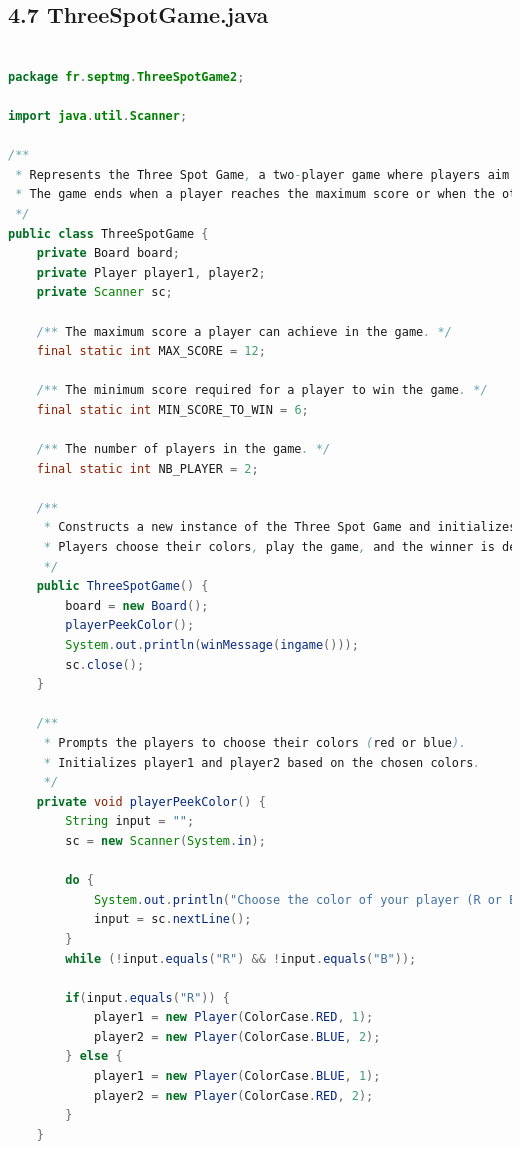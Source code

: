 \documentclass[a4paper,11pt]{article}
\begin{document}
\subsection{4.7 ThreeSpotGame.java}

\begin{lstlisting}[language=Java, breaklines=true]

package fr.septmg.ThreeSpotGame2;

import java.util.Scanner;

/**
 * Represents the Three Spot Game, a two-player game where players aim to score points by making strategic moves on a board.
 * The game ends when a player reaches the maximum score or when the other player fails to meet the minimum score requirement.
 */
public class ThreeSpotGame {
    private Board board;
    private Player player1, player2;
    private Scanner sc;

    /** The maximum score a player can achieve in the game. */
    final static int MAX_SCORE = 12;
    
    /** The minimum score required for a player to win the game. */
    final static int MIN_SCORE_TO_WIN = 6;
    
    /** The number of players in the game. */
    final static int NB_PLAYER = 2;
    
    /**
     * Constructs a new instance of the Three Spot Game and initializes the game components.
     * Players choose their colors, play the game, and the winner is determined.
     */
    public ThreeSpotGame() {
        board = new Board();
        playerPeekColor();
        System.out.println(winMessage(ingame()));
        sc.close();
    }

    /**
     * Prompts the players to choose their colors (red or blue).
     * Initializes player1 and player2 based on the chosen colors.
     */
    private void playerPeekColor() {
        String input = "";
        sc = new Scanner(System.in);

        do {
            System.out.println("Choose the color of your player (R or B): ");
            input = sc.nextLine();
        }
        while (!input.equals("R") && !input.equals("B"));

        if(input.equals("R")) {
            player1 = new Player(ColorCase.RED, 1);
            player2 = new Player(ColorCase.BLUE, 2);
        } else {
            player1 = new Player(ColorCase.BLUE, 1);
            player2 = new Player(ColorCase.RED, 2);
        }
    }


\end{lstlisting}
\end{document}
